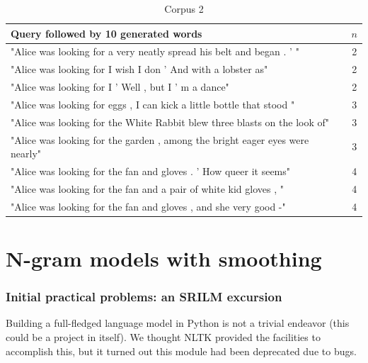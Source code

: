 \documentclass[a4paper,12pt]{article}
\begin{document}
\begin{table}[!h]
\small
\begin{tabular}{| l |c|}
\hline
Query followed by 10 generated words & $n$ \\ \hline
"Alice was looking for a very neatly spread his belt and began . ' " & 2\\ \hline
"Alice was looking for I wish I don ' And with a lobster as" & 2\\ \hline
"Alice was looking for I ' Well , but I ' m a dance" & 2\\ \hline
"Alice was looking for eggs , I can kick a little bottle that stood "& 3 \\ \hline
"Alice was looking for the White Rabbit blew three blasts on the look of"& 3 \\ \hline
"Alice was looking for the garden , among the bright eager eyes were nearly"& 3 \\ \hline
"Alice was looking for the fan and gloves . ' How queer it seems" & 4 \\ \hline
"Alice was looking for the fan and a pair of white kid gloves , " & 4 \\ \hline
"Alice was looking for the fan and gloves , and she very good -" & 4 \\ \hline
\end{tabular}
\caption{Corpus 2}
\label{tab:corpus2}
\end{table}


\section{N-gram models with smoothing}
\subsubsection{Initial practical problems: an SRILM excursion}
Building a full-fledged language model in Python is not a trivial endeavor (this could be a project in itself). We thought NLTK provided the facilities to accomplish this, but it turned out this module had been deprecated due to bugs. 
\end{document}
